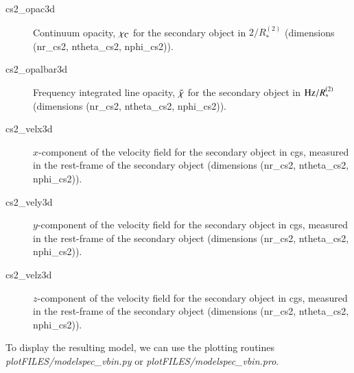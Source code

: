 \documentclass[10pt,a4paper]{article}
\begin{document}
\begin{enumerate}
\begin{description}
    \item[cs2\_opac3d] Continuum opacity, $\chi_{\rm C}$ for the secondary object in $2/R_\ast^{(2)}$ (dimensions (nr\_cs2, ntheta\_cs2, nphi\_cs2)).
    \item[cs2\_opalbar3d] Frequency integrated line opacity, $\bar{\chi}$ for the secondary object in ${\rm Hz}/R_\ast^{(2)}$ (dimensions (nr\_cs2, ntheta\_cs2, nphi\_cs2)).      
    \item[cs2\_velx3d] $x$-component of the velocity field for the secondary object in cgs, measured in the rest-frame of the secondary object (dimensions (nr\_cs2, ntheta\_cs2, nphi\_cs2)).
    \item[cs2\_vely3d] $y$-component of the velocity field for the secondary object in cgs, measured in the rest-frame of the secondary object (dimensions (nr\_cs2, ntheta\_cs2, nphi\_cs2)).
    \item[cs2\_velz3d] $z$-component of the velocity field for the secondary object in cgs, measured in the rest-frame of the secondary object (dimensions (nr\_cs2, ntheta\_cs2, nphi\_cs2)).
      \end{description}

\end{enumerate}
%
To display the resulting model, we can use the plotting routines
\textit{plotFILES/modelspec\_vbin.py} or
\textit{plotFILES/modelspec\_vbin.pro}.
%
\end{document}
